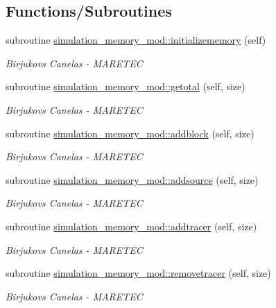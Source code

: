 \subsection*{Functions/\+Subroutines}
\begin{DoxyCompactItemize}
\item 
subroutine \hyperlink{namespacesimulation__memory__mod_ac8306165e4ec88fec9a2b8b719f61893}{simulation\+\_\+memory\+\_\+mod\+::initializememory} (self)
\begin{DoxyCompactList}\small\item\em Birjukovs Canelas -\/ M\+A\+R\+E\+T\+EC \end{DoxyCompactList}\item 
subroutine \hyperlink{namespacesimulation__memory__mod_acf04d6b930ed3ffbc0950afd86033c51}{simulation\+\_\+memory\+\_\+mod\+::getotal} (self, size)
\begin{DoxyCompactList}\small\item\em Birjukovs Canelas -\/ M\+A\+R\+E\+T\+EC \end{DoxyCompactList}\item 
subroutine \hyperlink{namespacesimulation__memory__mod_a4169689db37b3ba35e092096a7019f80}{simulation\+\_\+memory\+\_\+mod\+::addblock} (self, size)
\begin{DoxyCompactList}\small\item\em Birjukovs Canelas -\/ M\+A\+R\+E\+T\+EC \end{DoxyCompactList}\item 
subroutine \hyperlink{namespacesimulation__memory__mod_a940ff42fa3a49423f9ac98da2bffa54c}{simulation\+\_\+memory\+\_\+mod\+::addsource} (self, size)
\begin{DoxyCompactList}\small\item\em Birjukovs Canelas -\/ M\+A\+R\+E\+T\+EC \end{DoxyCompactList}\item 
subroutine \hyperlink{namespacesimulation__memory__mod_a5770021491589bbd61ea112d113a9c9d}{simulation\+\_\+memory\+\_\+mod\+::addtracer} (self, size)
\begin{DoxyCompactList}\small\item\em Birjukovs Canelas -\/ M\+A\+R\+E\+T\+EC \end{DoxyCompactList}\item 
subroutine \hyperlink{namespacesimulation__memory__mod_a5f95539e9740401e7046b79c40ad2ecd}{simulation\+\_\+memory\+\_\+mod\+::removetracer} (self, size)
\begin{DoxyCompactList}\small\item\em Birjukovs Canelas -\/ M\+A\+R\+E\+T\+EC \end{DoxyCompactList}\item 

\end{DoxyCompactItemize}
